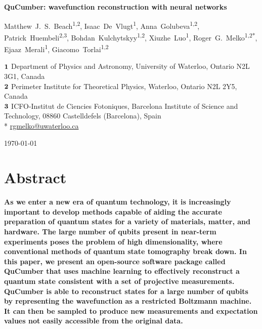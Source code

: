 \documentclass[submission, Phys, hidelnks]{SciPost}
\begin{document}
\begin{center}{\Large \textbf{
    QuCumber: wavefunction reconstruction with neural networks
}}\end{center}

\begin{center}
    Matthew~J.~S.~Beach\textsuperscript{1,2},
    Isaac~De~Vlugt\textsuperscript{1},
    Anna~Golubeva\textsuperscript{1,2},
    Patrick~Huembeli\textsuperscript{2,3},
    Bohdan~Kulchytskyy\textsuperscript{1,2},
    Xiuzhe~Luo\textsuperscript{1},
    Roger~G.~Melko\textsuperscript{1,2*},
    Ejaaz~Merali\textsuperscript{1},
    Giacomo~Torlai\textsuperscript{1,2}
\end{center}

\begin{center}
    ${\bf 1}$ Department of Physics and Astronomy, University of Waterloo,
    Ontario N2L 3G1, Canada
    \\
    ${\bf 2}$ Perimeter Institute for Theoretical Physics, Waterloo,
    Ontario N2L 2Y5, Canada
    \\
    ${\bf 3}$ ICFO-Institut de Ciencies Fotoniques, Barcelona Institute of Science and Technology,
    08860 Castelldefels (Barcelona), Spain\\

    * \href{mailto:rgmelko@uwaterloo.ca}{rgmelko@uwaterloo.ca} \\
\end{center}

\begin{center}
    \today
\end{center}


\section*{Abstract}
{\bf
As we enter a new era of quantum technology, it is increasingly important to develop methods capable of aiding 
the accurate preparation of quantum states for a variety of materials, matter, and hardware.
The large number of qubits present in near-term experiments poses the problem of high dimensionality, where conventional methods of quantum state tomography break down. 
        In this paper, we present an open-source software package called QuCumber that uses machine learning to effectively reconstruct a quantum state consistent with a set of projective measurements. 
        QuCumber is able to reconstruct states for a large number of qubits by representing the wavefunction as a restricted Boltzmann machine.
It can then be sampled to produce new measurements and expectation values not easily accessible from the original data.
}
\end{document}
